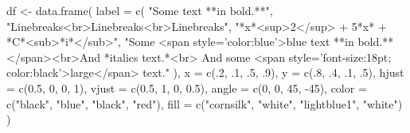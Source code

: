 \documentclass[]{book}
\newenvironment{Shaded}{}{}
\newcommand{\DataTypeTok}[1]{#1}
\newcommand{\DecValTok}[1]{#1}
\newcommand{\FloatTok}[1]{#1}
\newcommand{\KeywordTok}[1]{\textcolor[rgb]{0.00,0.00,1.00}{#1}}
\newcommand{\NormalTok}[1]{#1}
\newcommand{\StringTok}[1]{\textcolor[rgb]{0.00,0.50,0.50}{#1}}
\begin{document}
\begin{Shaded}
\begin{Highlighting}[]
\NormalTok{df <-}\StringTok{ }\KeywordTok{data.frame}\NormalTok{(}
  \DataTypeTok{label =} \KeywordTok{c}\NormalTok{(}
    \StringTok{"Some text **in bold.**"}\NormalTok{,}
    \StringTok{"Linebreaks<br>Linebreaks<br>Linebreaks"}\NormalTok{,}
    \StringTok{"*x*<sup>2</sup> + 5*x* + *C*<sub>*i*</sub>"}\NormalTok{,}
    \StringTok{"Some <span style='color:blue'>blue text **in bold.**</span><br>And *italics text.*<br>}
\StringTok{    And some <span style='font-size:18pt; color:black'>large</span> text."}
\NormalTok{  ),}
  \DataTypeTok{x =} \KeywordTok{c}\NormalTok{(.}\DecValTok{2}\NormalTok{, }\FloatTok{.1}\NormalTok{, }\FloatTok{.5}\NormalTok{, }\FloatTok{.9}\NormalTok{),}
  \DataTypeTok{y =} \KeywordTok{c}\NormalTok{(.}\DecValTok{8}\NormalTok{, }\FloatTok{.4}\NormalTok{, }\FloatTok{.1}\NormalTok{, }\FloatTok{.5}\NormalTok{),}
  \DataTypeTok{hjust =} \KeywordTok{c}\NormalTok{(}\FloatTok{0.5}\NormalTok{, }\DecValTok{0}\NormalTok{, }\DecValTok{0}\NormalTok{, }\DecValTok{1}\NormalTok{),}
  \DataTypeTok{vjust =} \KeywordTok{c}\NormalTok{(}\FloatTok{0.5}\NormalTok{, }\DecValTok{1}\NormalTok{, }\DecValTok{0}\NormalTok{, }\FloatTok{0.5}\NormalTok{),}
  \DataTypeTok{angle =} \KeywordTok{c}\NormalTok{(}\DecValTok{0}\NormalTok{, }\DecValTok{0}\NormalTok{, }\DecValTok{45}\NormalTok{, }\DecValTok{-45}\NormalTok{),}
  \DataTypeTok{color =} \KeywordTok{c}\NormalTok{(}\StringTok{"black"}\NormalTok{, }\StringTok{"blue"}\NormalTok{, }\StringTok{"black"}\NormalTok{, }\StringTok{"red"}\NormalTok{),}
  \DataTypeTok{fill =} \KeywordTok{c}\NormalTok{(}\StringTok{"cornsilk"}\NormalTok{, }\StringTok{"white"}\NormalTok{, }\StringTok{"lightblue1"}\NormalTok{, }\StringTok{"white"}\NormalTok{)}
\NormalTok{)}
\end{Highlighting}
\end{Shaded}
\end{document}
